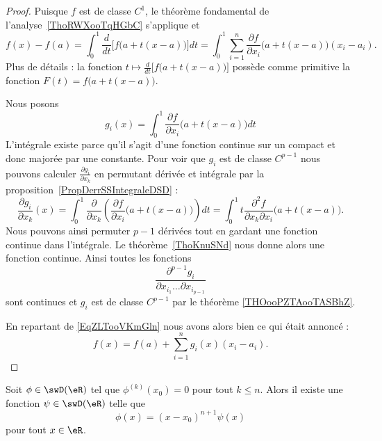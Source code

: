 \begin{proof}
	Puisque \( f\) est de classe \( C^1\), le théorème fondamental de l'analyse~\ref{ThoRWXooTqHGbC} s'applique et
	\begin{equation}    \label{EqZLTooVKmGln}
		f(x)-f(a)=\int_0^1\frac{ d }{ dt }\Big[ f\big( a+t(x-a) \big) \Big]dt=\int_0^1\sum_{i=1}^n\frac{ \partial f }{ \partial x_i }\big( a+t(x-a) \big)(x_i-a_i).
	\end{equation}
	Plus de détails : la fonction \( t\mapsto \frac{ d }{ dt }\Big[ f\big( a+t(x-a) \big) \Big]\) possède comme primitive la fonction \( F(t)=f\big( a+t(x-a) \big)\).

	Nous posons
	\begin{equation}
		g_i(x)=\int_0^1\frac{ \partial f }{ \partial x_i }\big( a+t(x-a) \big)dt
	\end{equation}
	L'intégrale existe parce qu'il s'agit d'une fonction continue sur un compact et donc majorée par une constante. Pour voir que \( g_i\) est de classe \( C^{p-1}\) nous pouvons calculer \( \frac{ \partial g_i }{ \partial x_k }\) en permutant dérivée et intégrale par la proposition~\ref{PropDerrSSIntegraleDSD} :
	\begin{equation}
		\frac{ \partial g_i }{ \partial x_k }(x)=\int_0^1\frac{ \partial  }{ \partial x_k }\left( \frac{ \partial f }{ \partial x_i }\big( a+t(x-a) \big) \right)dt=\int_0^1 t\frac{ \partial^2f }{ \partial x_k\partial x_i }\big( a+t(x-a) \big).
	\end{equation}
	Nous pouvons ainsi permuter \( p-1\) dérivées tout en gardant une fonction continue dans l'intégrale. Le théorème~\ref{ThoKnuSNd} nous donne alors une fonction continue. Ainsi toutes les fonctions
	\begin{equation}
		\frac{ \partial^{p-1}g_i }{ \partial x_{i_1}\ldots\partial x_{i_{p-1}} }
	\end{equation}
	sont continues et \( g_i\) est de classe \( C^{p-1}\) par le théorème \ref{THOooPZTAooTASBhZ}.

	En repartant de \eqref{EqZLTooVKmGln} nous avons alors bien ce qui était annoncé :
	\begin{equation}
		f(x)=f(a)+\sum_{i=1}^ng_i(x)(x_i-a_i).
	\end{equation}
\end{proof}

\begin{corollary}       \label{CorQBXHooZVKeNG}
	Soit \( \phi\in\swD(\eR)\) tel que \( \phi^{(k)}(x_0)=0\) pour tout \( k\leq n\). Alors il existe une fonction \( \psi\in\swD(\eR)\) telle que
	\begin{equation}
		\phi(x)=(x-x_0)^{n+1}\psi(x)
	\end{equation}
	pour tout \( x\in \eR\).
\end{corollary}

